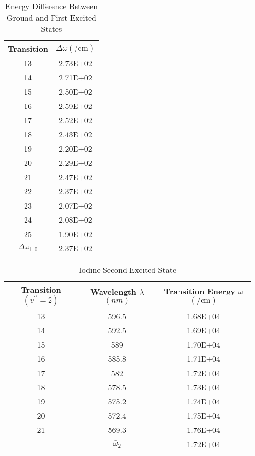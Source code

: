 \documentclass[12pt]{article}
\begin{document}
	\begin{table}[htbp]
		\centering
		\caption{Energy Difference Between Ground and First Excited States}
		\begin{tabular}{cc}
			\toprule
			Transition & $\Delta\omega (\unit{\per\centi\meter})$ \\
			\midrule
			13 & 2.73E+02 \\
			14 & 2.71E+02 \\
			15 & 2.50E+02 \\
			16 & 2.59E+02 \\
			17 & 2.52E+02 \\
			18 & 2.43E+02 \\
			19 & 2.20E+02 \\
			20 & 2.29E+02 \\
			21 & 2.47E+02 \\
			22 & 2.37E+02 \\
			23 & 2.07E+02 \\
			24 & 2.08E+02 \\
			25 & 1.90E+02 \\
			\midrule
			$\Delta \bar{\omega}_{1,0}$ & 2.37E+02 \\
			\bottomrule
		\end{tabular}%
		\label{tab:addlabel}%
	\end{table}%
		
	\begin{table}[htbp]
		\centering
		\caption{Iodine Second Excited State}
		\begin{tabular}{ccc}
			\toprule
			Transition $(v^{\prime\prime} = 2)$ & Wavelength $\lambda$ $(\unit{nm})$ & Transition Energy $\omega$ $(\unit{\per\centi\meter})$ \\
			\midrule
			13 & 596.5 & 1.68E+04 \\
			14 & 592.5 & 1.69E+04 \\
			15 & 589 & 1.70E+04 \\
			16 & 585.8 & 1.71E+04 \\
			17 & 582 & 1.72E+04 \\
			18 & 578.5 & 1.73E+04 \\
			19 & 575.2 & 1.74E+04 \\
			20 & 572.4 & 1.75E+04 \\
			21 & 569.3 & 1.76E+04 \\
			\cmidrule{2-3}      & $\bar{\omega}_2$ & 1.72E+04 \\
			\bottomrule
		\end{tabular}%
		\label{tab:IodineSecondExcitedState}%
	\end{table}%
	
\end{document}
